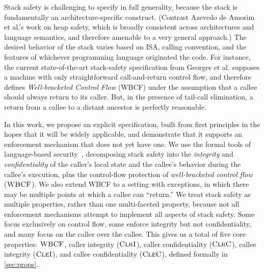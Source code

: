 Stack safety is challenging to specify in full generality, because the stack is
fundamentally an architecture-specific construct.
(Contrast Azevedo de Amorim et al.'s \cite{DBLP:conf/post/AmorimHP18} work on heap safety,
which is broadly consistent across architectures and language semantics, and therefore
amenable to a very general approach.)
The desired behavior of the stack varies based on ISA, calling convention,
and the features of whichever programming language originated the code.
%
For instance, the current state-of-the-art stack-safety specification from Georges et al.
\cite{Georges22:TempsDesCerises} supposes a machine with only straightforward call-and-return
control flow, and therefore defines {\it Well-bracketed Control Flow} (WBCF) under the assumption that
a callee should always return to its caller. But, in the presence of tail-call elimination, a
return from a callee to a distant ancestor is perfectly reasonable.

In this work, we propose an explicit specification, built from first principles
in the hopes that it will be widely applicable, and demonstrate that it supports
an enforcement mechanism that does not yet have one.
We use the formal tools of language-based
security~\cite{sabelfeld2003language}, decomposing stack safety into
the {\em integrity} and {\em confidentiality} of the caller’s local state
and the callee's behavior during the callee's execution, plus the control-flow protection
of {\em well-bracketed control flow}~\cite{SkorstengaardSTKJFP} (\(\textnormal{\sc WBCF}\)).
\ifexceptions
We also extend WBCF to a setting with exceptions,
in which there may be multiple points at which a callee can ``return.''
\fi
%
We treat stack safety as multiple properties, rather than one multi-faceted property, because
not all enforcement mechanisms attempt to implement all aspects of stack safety. Some focus
exclusively on control flow, some enforce integrity but not confidentiality, and many
focus on the caller over the callee.
%
%
This gives us a total of five core properties: \(\textnormal{\sc WBCF}\),
caller integrity (\(\textnormal{\sc ClrI}\)), caller confidentiality (\(\textnormal{\sc ClrC}\)),
callee integrity (\(\textnormal{\sc CleI}\)), and callee confidentiality (\(\textnormal{\sc CleC}\)), defined formally
in \cref{sec:props}.
%

